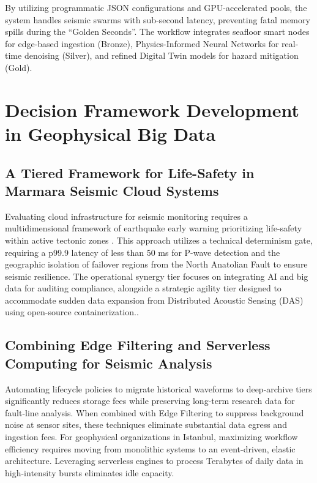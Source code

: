 \documentclass[data,article,accept,pdftex,moreauthors]{Definitions/mdpi}
\begin{document}
By utilizing programmatic JSON configurations and GPU-accelerated pools, the system handles seismic swarms with sub-second latency, preventing fatal memory spills during the ``Golden Seconds''. The workflow integrates seafloor smart nodes for edge-based ingestion (Bronze), Physics-Informed Neural Networks for real-time denoising (Silver), and refined Digital Twin models for hazard mitigation (Gold).

\section{Decision Framework Development in Geophysical Big Data}

\subsection{A Tiered Framework for Life-Safety in Marmara Seismic Cloud Systems}

Evaluating cloud infrastructure for seismic monitoring requires a multidimensional framework of earthquake early warning prioritizing life-safety within active tectonic zones \cite{cremen2020}. This approach utilizes a technical determinism gate, requiring a p99.9 latency of less than 50 ms for P-wave detection and the geographic isolation of failover regions from the North Anatolian Fault to ensure seismic resilience. The operational synergy tier focuses on integrating AI and big data for auditing compliance, alongside a strategic agility tier designed to accommodate sudden data expansion from Distributed Acoustic Sensing (DAS) using open-source containerization..

\subsection{Combining Edge Filtering and Serverless Computing for Seismic Analysis}

Automating lifecycle policies to migrate historical waveforms to deep-archive tiers significantly reduces storage fees while preserving long-term research data for fault-line analysis. When combined with Edge Filtering to suppress background noise at sensor sites, these techniques eliminate substantial data egress and ingestion fees. For geophysical organizations in Istanbul, maximizing workflow efficiency requires moving from monolithic systems to an event-driven, elastic architecture. Leveraging serverless engines to process Terabytes of daily data in high-intensity bursts eliminates idle capacity. 
\end{document}
